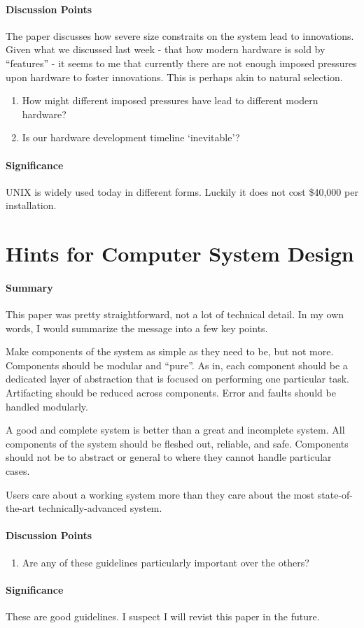 \paragraph{\textbf{Discussion Points}}
The paper discusses how severe size constraits on the system lead to
innovations. Given what we discussed last week - that how modern hardware
is sold by ``features'' - it seems to me that currently there are not enough
imposed pressures upon hardware to foster innovations. This is perhaps akin
to natural selection.
\begin{enumerate}
    \item How might different imposed pressures have lead to different modern
    hardware?
    \item Is our hardware development timeline `inevitable'?
\end{enumerate}

\paragraph{\textbf{Significance}}
UNIX is widely used today in different forms. Luckily it does not cost \$40,000
per installation.

\section {Hints for Computer System Design \cite{lampson1983hints}}

\paragraph{\textbf{Summary}}
This paper was pretty straightforward, not a lot of technical detail. In my own
words, I would summarize the message into a few key points.

Make components of the system as simple as they need to be, but not more. 
Components should be modular and ``pure''. As in, each component should be a
dedicated layer of abstraction that is focused on performing one particular
task. Artifacting should be reduced across components. Error and faults should
be handled modularly.

A good and complete system is better than a great and incomplete system. All
components of the system should be fleshed out, reliable, and safe. Components
should not be to abstract or general to where they cannot handle particular
cases.

Users care about a working system more than they care about the most
state-of-the-art technically-advanced system.

\paragraph{\textbf{Discussion Points}}
\begin{enumerate}
    \item Are any of these guidelines particularly important over the others?
\end{enumerate}

\paragraph{\textbf{Significance}}
These are good guidelines. I suspect I will revist this paper in the future.